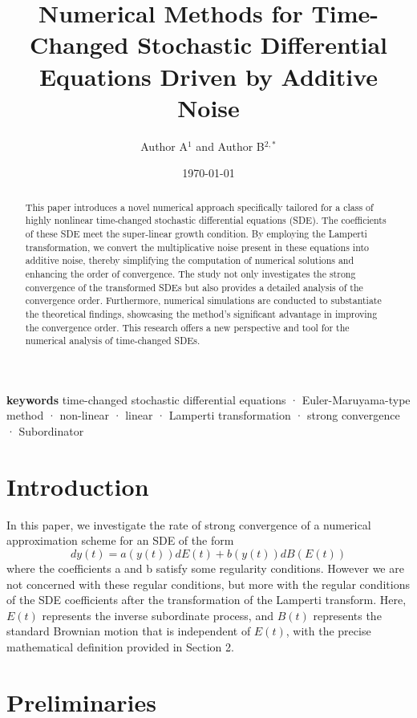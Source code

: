 \documentclass[10pt,reqno,final]{amsart}
\title[Short Title]{Numerical Methods for Time-Changed Stochastic Differential Equations Driven by Additive Noise
}
\author[Author A and Author B]{Author A${}^{1}$ and Author B${}^{2,*}$}
\date{\today}
\theoremstyle{plain}
\theoremstyle{definition}
\theoremstyle{remark}
\numberwithin{equation}{section}
\numberwithin{figure}{section}
\numberwithin{table}{section}
\begin{document}
\begin{abstract}
	
This paper introduces a novel numerical approach specifically tailored for a class of highly nonlinear time-changed stochastic differential equations (SDE). The coefficients of these SDE meet the super-linear growth condition. By employing the Lamperti transformation, we convert the multiplicative noise present in these equations into additive noise, thereby simplifying the computation of numerical solutions and enhancing the order of convergence. The study not only investigates the strong convergence of the transformed SDEs but also provides a detailed analysis of the convergence order. Furthermore, numerical simulations are conducted to substantiate the theoretical findings, showcasing the method's significant advantage in improving the convergence order. This research offers a new perspective and tool for the numerical analysis of time-changed SDEs.


\end{abstract}


\maketitle

\textbf{keywords} time-changed stochastic differential equations · Euler-Maruyama-type method · non-linear · linear · Lamperti transformation · strong convergence ·  Subordinator

\section{Introduction}

In this paper, we investigate the rate of strong convergence of a numerical approximation scheme for an SDE of the form
\begin{equation}\label{original SDE}
	dy(t)=a(y(t))dE(t)+b(y(t))dB(E(t))
\end{equation}
where the coeﬃcients a and b satisfy some regularity conditions. However we are not concerned with these regular conditions, but more with the regular conditions of the SDE coefficients after the transformation of the Lamperti transform.
Here, $E(t)$ represents the inverse subordinate process, and $B(t)$ represents the standard Brownian motion that is independent of $E(t)$, with the precise mathematical definition provided in Section 2.

\section{Preliminaries}
\end{document}
